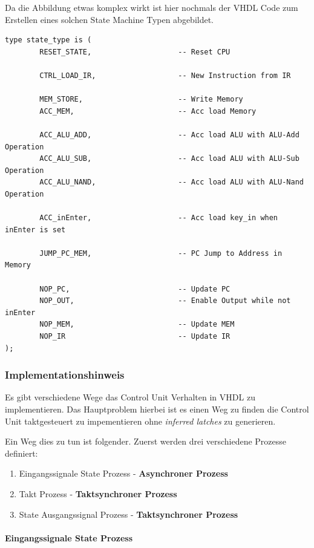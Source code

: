 Da die Abbildung etwas komplex wirkt ist hier nochmals der VHDL Code zum Erstellen eines solchen State Machine Typen abgebildet.

\begin{verbatim}
type state_type is (
        RESET_STATE,                    -- Reset CPU

        CTRL_LOAD_IR,                   -- New Instruction from IR

        MEM_STORE,                      -- Write Memory
        ACC_MEM,                        -- Acc load Memory

        ACC_ALU_ADD,                    -- Acc load ALU with ALU-Add Operation
        ACC_ALU_SUB,                    -- Acc load ALU with ALU-Sub Operation
        ACC_ALU_NAND,                   -- Acc load ALU with ALU-Nand Operation

        ACC_inEnter,                    -- Acc load key_in when inEnter is set

        JUMP_PC_MEM,                    -- PC Jump to Address in Memory

        NOP_PC,                         -- Update PC
        NOP_OUT,                        -- Enable Output while not inEnter
        NOP_MEM,                        -- Update MEM
        NOP_IR                          -- Update IR
);
\end{verbatim}

\subsubsection{Implementationshinweis}

Es gibt verschiedene Wege das Control Unit Verhalten in VHDL zu implementieren. Das Hauptproblem hierbei ist es einen Weg zu finden die Control Unit taktgesteuert zu impementieren ohne \emph{inferred latches} zu generieren.

Ein Weg dies zu tun ist folgender. Zuerst werden drei verschiedene Prozesse definiert:

\begin{enumerate}
	\item Eingangssignale State Prozess - \textbf{Asynchroner Prozess}
	\item Takt Prozess - \textbf{Taktsynchroner Prozess}
	\item State Ausgangssignal Prozess  - \textbf{Taktsynchroner Prozess}
\end{enumerate}

\paragraph{Eingangssignale State Prozess}

